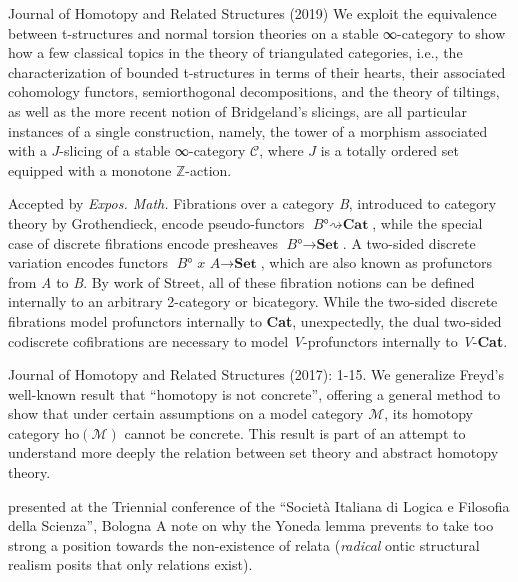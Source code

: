 \begin{eyenumerate}
   \item {}
   {Journal of Homotopy and Related Structures (2019)}
   {We exploit the equivalence between t-structures and normal torsion theories on a stable ∞-category to show how a few classical topics in the theory of triangulated categories, i.e., the characterization of bounded t-structures in terms of their hearts, their associated cohomology functors, semiorthogonal decompositions, and the theory of tiltings, as well as the more recent notion of Bridgeland's slicings, are all particular instances of a single construction, namely, the tower of a morphism associated with a $J$-slicing of a stable ∞-category $\mathcal C$, where $J$ is a totally ordered set equipped with a monotone $\mathbb{Z}$-action.}
   \item {}
   {Accepted by \emph{Expos. Math.}}
   {Fibrations over a category \textit{B}, introduced to category theory by Grothendieck, encode pseudo-functors $\textit{B°} \rightsquigarrow {\textbf{Cat}}$, while the special case of discrete fibrations encode presheaves $\textit{B°} \to \textbf{Set}$. A two-sided discrete variation encodes functors $\textit{B° x A} \to \textbf{Set}$, which are also known as profunctors from \textit{A} to \textit{B}. By work of Street, all of these fibration notions can be defined internally to an arbitrary 2-category or bicategory. While the two-sided discrete fibrations model profunctors internally to \textbf{Cat}, unexpectedly, the dual two-sided codiscrete cofibrations are necessary to model \textit{V}-profunctors internally to \textit{V}-\textbf{Cat}.}
   \item {}
   {Journal of Homotopy and Related Structures (2017): 1-15.}
   {We generalize Freyd's well-known result that ``homotopy is not concrete'', offering a general method to show that under certain assumptions on a model category $\mathcal M$, its homotopy category $\text{ho}(\mathcal M)$ cannot be concrete. This result is part of an attempt to understand more deeply the relation between set theory and abstract homotopy theory.}
   \item {}
   {presented at the Triennial conference of the “Società Italiana di Logica e Filosofia della Scienza”, Bologna}
   {A note on why the Yoneda lemma prevents to take too strong a position towards the non-existence of relata (\emph{radical} ontic structural realism posits that only relations exist).}

\end{eyenumerate}
